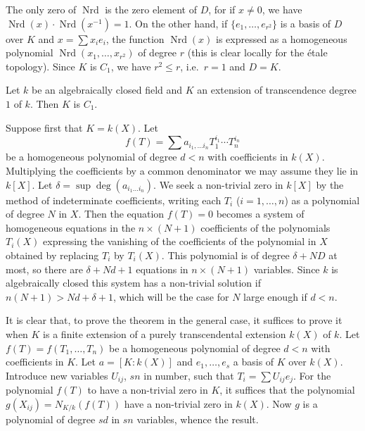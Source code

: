 The only zero of $\operatorname{Nrd}$ is the zero element of $D$, for if
$x\ne 0$, we have $\operatorname{Nrd}(x)\cdot \operatorname{Nrd}(x^{-1}) = 1$. 
On the other hand, if $\{e_1,\dotsc,e_{r^2}\}$ is a basis of $D$ over $K$ and
$x=\sum x_i e_i$, the function $\operatorname{Nrd}(x)$ is expressed as a homogeneous
polynomial $\operatorname{Nrd}(x_1,\dotsc,x_{r^2})$ of degree $r$ (this is
clear locally for the \'etale topology). Since $K$ is $C_1$, we have
$r^2\leqslant r$, i.e.\ $r=1$ and $D=K$. 





\begin{theorem}[Tsen]\label{I:3-2-3}
Let $k$ be an algebraically closed field and $K$ an extension of
transcendence degree $1$ of $k$. Then $K$ is $C_1$.
\end{theorem}

Suppose first that $K=k(X)$. Let
\[
  f(T) = \sum a_{i_1,\dotsc i_n} T_1^{i_1} \dotsm T_n^{i_n}
\]
be a homogeneous polynomial of degree $d<n$ with coefficients in $k(X)$.
Multiplying the coefficients by a common denominator we may assume
they lie in $k[X]$. Let $\delta=\sup\deg(a_{i_1\dotsc i_n})$. We
seek a non-trivial zero in $k[X]$ by the method of indeterminate
coefficients, writing each $T_i$ ($i=1,\dotsc,n$) as a
polynomial of degree $N$ in $X$. Then the equation $f(T)=0$ becomes a system
of homogeneous equations in the $n\times (N+1)$ coefficients of the polynomials
$T_i(X)$ expressing the vanishing of the coefficients of the polynomial in $X$ obtained by
replacing $T_i$ by $T_i(X)$. This polynomial is of degree $\delta+N D$ at most,
so there are $\delta+N d+1$ equations in $n\times (N+1)$ variables. Since $k$
is algebraically closed this system has a non-trivial solution if
$n(N+1)>N d+\delta+1$, which will be the case for $N$ large enough if $d<n$.

It is clear that, to prove the theorem in the general case, it
suffices to prove it when $K$ is a finite extension of a purely
transcendental extension $k(X)$ of $k$. Let $f(T)=f(T_1,\dotsc,T_n)$ be a
homogeneous polynomial of degree $d<n$ with coefficients in $K$. Let
$a=[K:k(X)]$ and $e_1,\dotsc,e_s$ a basis of $K$ over $k(X)$. Introduce
new variables $U_{i j}$, $s n$ in number, such that
$T_i=\sum U_{i j}e_j$. For the polynomial $f(T)$ to have a non-trivial
zero in $K$, it suffices that the polynomial
$g(X_{i j}) = N_{K/k}(f( T))$ have a non-trivial zero in $k(X)$.
Now $g$ is a polynomial of degree $s d$ in $s n$ variables, whence the
result. 





